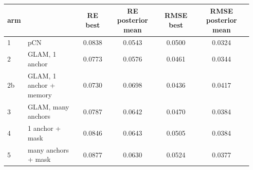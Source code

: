 \begin{tabular}{llcccc}\toprule
arm & & RE best & RE posterior mean & RMSE best & RMSE posterior mean \\ \midrule
1 & pCN & 0.0838 & 0.0543 & 0.0500 & 0.0324 \\
2 & GLAM, 1 anchor & 0.0773 & 0.0576 & 0.0461 & 0.0344 \\
2b & GLAM, 1 anchor + memory & 0.0730 & 0.0698 & 0.0436 & 0.0417 \\
3 & GLAM, many anchors & 0.0787 & 0.0642 & 0.0470 & 0.0384 \\
4 & 1 anchor + mask & 0.0846 & 0.0643 & 0.0505 & 0.0384 \\
5 & many anchors + mask & 0.0877 & 0.0630 & 0.0524 & 0.0377 \\
\bottomrule\end{tabular}
